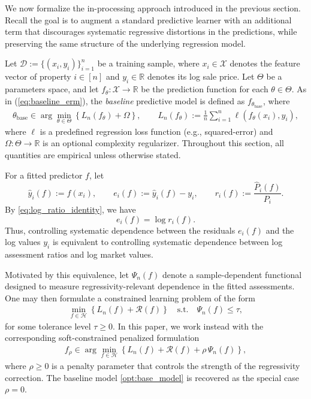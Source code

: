 \documentclass[12pt, draft]{article}
\theoremstyle{plain}
\theoremstyle{definition}
\newcommand{\R}{\mathbb{R}}
\newcommand{\1}{\mathbf{1}}
\newcommand{\X}{\mathcal{X}}
\newcommand{\D}{\mathcal{D}}
\renewcommand{\H}{\mathcal{H}}
\renewcommand{\R}{\mathbb{R}}
\begin{document}
{We now formalize the in-processing approach introduced in the previous section. Recall the goal is to augment a standard predictive learner with an additional term that discourages systematic regressive distortions in the predictions, while preserving the same structure of the underlying regression model.

Let $\D := \{(x_i,y_i)\}_{i=1}^n$ be a training sample, where $x_i \in \X$ denotes the feature vector of property $i \in [n]$ and $y_i \in \R$ denotes its log sale price. Let $\Theta$ be a parameters space, and let $f_\theta:\X \to \R$ be the prediction function for each $\theta \in \Theta$. As in (\ref{eq:baseline_erm}), the \textit{baseline} predictive model is defined as $f_{\theta_\mathrm{base}}$, where
\begin{align}
    \label{opt:base_model}
    \theta_{\mathrm{base}}
    \in
    \arg\min_{\theta \in \Theta}
    \left\{
        L_n(f_\theta) + \Omega
    \right\},
    \qquad
    L_n(f_\theta) := \frac{1}{n}\sum_{i=1}^n \ell(f_\theta(x_i),y_i),
\end{align}
where $\ell$ is a predefined regression loss function (e.g., squared-error) and $\Omega:\Theta \to \R$ is an optional complexity regularizer. Throughout this section, all quantities are empirical unless otherwise stated.

For a fitted predictor $f$, let
\[
\hat y_i(f) := f(x_i),
\qquad
e_i(f) := \hat y_i(f)-y_i,
\qquad
r_i(f) := \frac{\hat P_i(f)}{P_i}.
\]
By \eqref{eq:log_ratio_identity}, we have
\[
e_i(f)=\log r_i(f).
\]
Thus, controlling systematic dependence between the residuals $e_i(f)$ and the log values $y_i$ is equivalent to controlling systematic dependence between log assessment ratios and log market values.

Motivated by this equivalence, let $\Psi_n(f)$ denote a sample-dependent functional designed to measure regressivity-relevant dependence in the fitted assessments. One may then formulate a constrained learning problem of the form
\begin{align}
    \label{opt:general_constrained_model}
    \min_{f \in \H}
    \left\{
        L_n(f) + \mathcal{R}(f)
    \right\}
    \quad
    \text{s.t.}
    \quad
    \Psi_n(f) \le \tau,
\end{align}
for some tolerance level $\tau \ge 0$. In this paper, we work instead with the corresponding soft-constrained penalized formulation
\begin{align}
    \label{opt:general_penalized_model}
    f_{\rho}
    \in
    \arg\min_{f \in \H}
    \left\{
        L_n(f) + \mathcal{R}(f) + \rho\,\Psi_n(f)
    \right\},
\end{align}
where $\rho \ge 0$ is a penalty parameter that controls the strength of the regressivity correction. The baseline model \eqref{opt:base_model} is recovered as the special case $\rho=0$.

}
\end{document}
